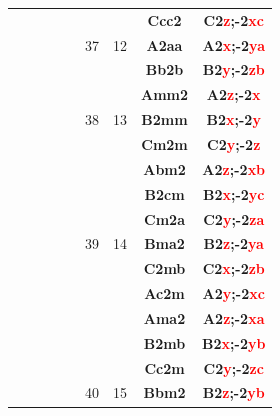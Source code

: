 \documentclass{article}      %
\begin{document}
\begin{small}
\begin{longtable}[c]{|c|c|c|c|c|c|c|c|c|}
          &  & & & &  & &\textbf{Ccc2}         &\textbf{C2\textcolor{red}{z};-2\textcolor{red}{xc}}\\\cline{8-9}          
	  &  & & & &\textrm{37}  &\textrm{12} &\textbf{A2aa}         &\textbf{A2\textcolor{red}{x};-2\textcolor{red}{ya}}\\\cline{8-9}          
          &  & & & &  & &\textbf{Bb2b}         &\textbf{B2\textcolor{red}{y};-2\textcolor{red}{zb}}\\\cline{6-9}          
          &  & & & &  & &\textbf{Amm2}         &\textbf{A2\textcolor{red}{z};-2\textcolor{red}{x}}\\\cline{8-9}           
	  &  & & & &\textrm{38}  &\textrm{13} &\textbf{B2mm}         &\textbf{B2\textcolor{red}{x};-2\textcolor{red}{y}}\\\cline{8-9}           
          &  & & & &  & &\textbf{Cm2m}         &\textbf{C2\textcolor{red}{y};-2\textcolor{red}{z}}\\\cline{6-9}           
          &  & & & &  & &\textbf{Abm2}         &\textbf{A2\textcolor{red}{z};-2\textcolor{red}{xb}}\\\cline{8-9}          
          &  & & & &  & &\textbf{B2cm}         &\textbf{B2\textcolor{red}{x};-2\textcolor{red}{yc}}\\\cline{8-9}          
          &  & & & &  & &\textbf{Cm2a}         &\textbf{C2\textcolor{red}{y};-2\textcolor{red}{za}}\\\cline{8-9}          
	  &  & & & &\textrm{39}  &\textrm{14} &\textbf{Bma2}         &\textbf{B2\textcolor{red}{z};-2\textcolor{red}{ya}}\\\cline{8-9}          
          &  & & & &  & &\textbf{C2mb}         &\textbf{C2\textcolor{red}{x};-2\textcolor{red}{zb}}\\\cline{8-9}          
          &  & & & &  & &\textbf{Ac2m}         &\textbf{A2\textcolor{red}{y};-2\textcolor{red}{xc}}\\\cline{6-9}          
          &  & & & &  & &\textbf{Ama2}         &\textbf{A2\textcolor{red}{z};-2\textcolor{red}{xa}}\\\cline{8-9}          
          &  & & & &  & &\textbf{B2mb}         &\textbf{B2\textcolor{red}{x};-2\textcolor{red}{yb}}\\\cline{8-9}          
          &  & & & &  & &\textbf{Cc2m}         &\textbf{C2\textcolor{red}{y};-2\textcolor{red}{zc}}\\\cline{8-9}          
	  &  & & & &\textrm{40}  &\textrm{15} &\textbf{Bbm2}         &\textbf{B2\textcolor{red}{z};-2\textcolor{red}{yb}}\\\cline{8-9}          

\end{longtable}
\end{small}
\end{document}

